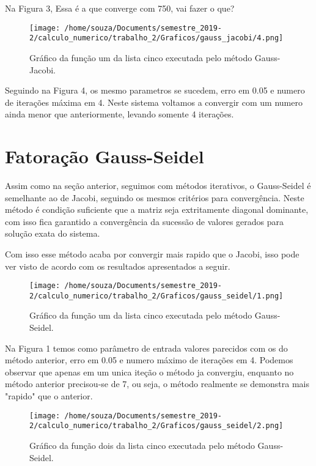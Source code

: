 \documentclass[12pt]{article}
\begin{document}
Na Figura 3, Essa é a que converge com 750, vai fazer o que?

\begin{figure}[!h]
    \centering
    \texttt{[image: /home/souza/Documents/semestre\_2019-2/calculo\_numerico/trabalho\_2/Graficos/gauss\_jacobi/4.png]}
    \caption{Gráfico da função um da lista cinco executada pelo método Gauss-Jacobi.}
\end{figure}

Seguindo na Figura 4, os mesmo parametros se sucedem, erro em 0.05 e numero de iterações máxima em 4. Neste sistema voltamos a convergir com um numero ainda menor que anteriormente, levando somente 4 iterações.

\section{Fatoração Gauss-Seidel}

Assim como na seção anterior, seguimos com métodos iterativos, o Gauss-Seidel é semelhante ao de Jacobi, seguindo os mesmos critérios para convergência. Neste método é condição suficiente que a matriz seja extritamente diagonal dominante, com isso fica garantido a convergência da sucessão de valores gerados para solução exata do sistema.

Com isso esse método acaba por convergir mais rapido que o Jacobi, isso pode ver visto de acordo com os resultados apresentados a seguir.

\begin{figure}[!h]
    \centering
    \texttt{[image: /home/souza/Documents/semestre\_2019-2/calculo\_numerico/trabalho\_2/Graficos/gauss\_seidel/1.png]}
    \caption{Gráfico da função um da lista cinco executada pelo método Gauss-Seidel.}
\end{figure}

Na Figura 1 temos como parâmetro de entrada valores parecidos com os do método anterior, erro em 0.05 e numero máximo de iterações em 4. Podemos observar que apenas em um unica iteção o método ja convergiu, enquanto no método anterior precisou-se de 7, ou seja, o método realmente se demonstra mais "rapido" que o anterior.

\begin{figure}[!h]
    \centering
    \texttt{[image: /home/souza/Documents/semestre\_2019-2/calculo\_numerico/trabalho\_2/Graficos/gauss\_seidel/2.png]}
    \caption{Gráfico da função dois da lista cinco executada pelo método Gauss-Seidel.}
\end{figure}
\end{document}

